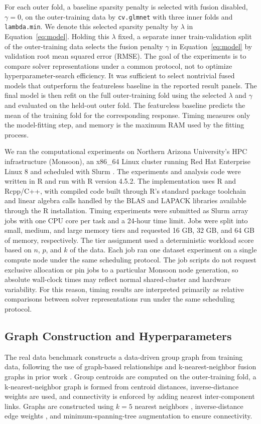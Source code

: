 \documentclass[twoside,11pt]{article}
\begin{document}
For each outer fold, a baseline sparsity penalty is selected with fusion disabled, $\gamma=0$, on the outer-training data by \texttt{cv.glmnet} with three inner folds and \texttt{lambda.min}. 
We denote this selected sparsity penalty by $\lambda$ in Equation~\ref{eq:model}. 
Holding this $\lambda$ fixed, a separate inner train-validation split of the outer-training data selects the fusion penalty $\gamma$ in Equation~\ref{eq:model} by validation root mean squared error (RMSE).
The goal of the experiments is to compare solver representations under a common protocol, not to optimize hyperparameter-search efficiency.
It was sufficient to select nontrivial fused models that outperform the featureless baseline in the reported result panels. 
The final model is then refit on the full outer-training fold using the selected $\lambda$ and $\gamma$ and evaluated on the held-out outer fold. 
The featureless baseline predicts the mean of the training fold for the corresponding response. 
Timing measures only the model-fitting step, and memory is the maximum RAM used by the fitting process.

We ran the computational experiments on Northern Arizona University's HPC infrastructure (Monsoon), an x86\_64 Linux cluster running Red Hat Enterprise Linux 8 and scheduled with Slurm \citep{nau_monsoon}.
The experiments and analysis code were written in R and run with R version 4.5.2. 
The implementation uses R and Rcpp/C++, with compiled code built through R's standard package toolchain and linear algebra calls handled by the BLAS and LAPACK libraries available through the R installation.
Timing experiments were submitted as Slurm array jobs with one CPU core per task and a 24-hour time limit. 
Jobs were split into small, medium, and large memory tiers and requested 16 GB, 32 GB, and 64 GB of memory, respectively. 
The tier assignment used a deterministic workload score based on $n$, $p$, and $k$ of the data.
Each job ran one dataset experiment on a single compute node under the same scheduling protocol.
The job scripts do not request exclusive allocation or pin jobs to a particular Monsoon node generation, so absolute wall-clock times may reflect normal shared-cluster and hardware variability. 
For this reason, timing results are interpreted primarily as relative comparisons between solver representations run under the same scheduling protocol.


\subsection{Graph Construction and Hyperparameters}
The real data benchmark constructs a data-driven group graph from training data, following the use of graph-based relationships and k-nearest-neighbor fusion graphs in prior work \citep{hallac2015network,padilla2020adaptive}.
Group centroids are computed on the outer-training fold, a k-nearest-neighbor graph is formed from centroid distances, inverse-distance weights are used, and connectivity is enforced by adding nearest inter-component links.
Graphs are constructed using \(k=5\) nearest neighbors \citep{hallac2015network,padilla2020knn}, inverse-distance edge weights \citep{hallac2015network}, and minimum-spanning-tree augmentation to ensure connectivity.
\end{document}
